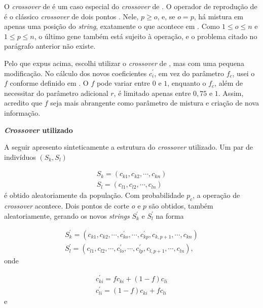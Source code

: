 		O \emph{crossover} de \cite{metodo2004} é um caso especial do \emph{crossover} de \cite{metodo2011}. O operador de reprodução de \cite{metodo2011} é o clássico \emph{crossover} de dois pontos \cite{Linden2008}. Nele, $p \geq o$, e, se $o = p$, há mistura em apenas uma posição do \emph{string}, exatamente o que acontece em \cite{metodo2004}. Como $1 \leq o \leq n$ e $1 \leq p \leq n$, o último gene também está sujeito à operação, e o problema citado no parágrafo anterior não existe.
		
	Pelo que expus acima, escolhi utilizar o \emph{crossover} de \cite{metodo2011}, mas com uma pequena modificação. No cálculo dos novos coeficientes $c^{'}_{i}$, em vez do parâmetro $f_c$, usei o $f$ conforme definido em \cite{metodo2004}. O $f$ pode variar entre $0$ e $1$, enquanto o $f_c$, além de necessitar do parâmetro adicional $r$, é limitado apenas entre $0,75$ e $1$. Assim, acredito que $f$ seja mais abrangente como parâmetro de mistura e criação de nova informação.
	
	\textbf{\emph{Crossover} utilizado}
	
	A seguir apresento sinteticamente a estrutura do \emph{crossover} utilizado. Um par de indivíduos $(S_k, S_l)$
	
	\begin{equation}
		\begin{array}{l}
			S_k = (c_{k1}, c_{k2}, \cdots, c_{kn})	\\
			S_l = (c_{l1}, c_{l2}, \cdots, c_{ln})	
		\end{array}
	\end{equation}
	é obtido aleatoriamente da população. Com probabilidade $p_c$, a operação de \emph{crossover} acontece. Dois pontos de corte $o$ e $p$ são obtidos, também aleatoriamente, gerando os novos \emph{strings} $S^{'}_k$ e $S^{'}_l$ na forma
		
	\begin{equation}
		\begin{array}{l}
			S^{'}_k = (c_{k1}, c_{k2}, \cdots, c^{'}_{ko}, \cdots , c^{'}_{kp}, c_{k,p+1}, \cdots, c_{kn})	\\
			S^{'}_l = (c_{l1}, c_{l2}, \cdots, c^{'}_{lo}, \cdots , c^{'}_{lp}, c_{l,p+1}, \cdots, c_{ln}),
		\end{array}
	\end{equation}
	onde
	
	\begin{equation}\label{eq:recombinacao}
		\begin{array}{l}
			c^{'}_{ki} = f c_{ki} + (1 - f) c_{li}     \\
			c^{'}_{li} = (1 - f) c_{ki} + f c_{li}
		\end{array}
	\end{equation}
	e
	
